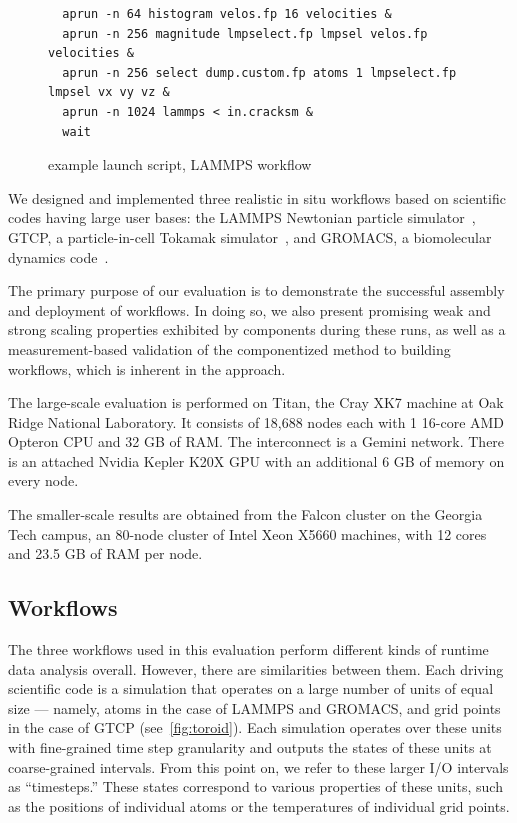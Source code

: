 \begin{figure}
  \begin{lstlisting}
  aprun -n 64 histogram velos.fp 16 velocities &
  aprun -n 256 magnitude lmpselect.fp lmpsel velos.fp velocities &
  aprun -n 256 select dump.custom.fp atoms 1 lmpselect.fp lmpsel vx vy vz &
  aprun -n 1024 lammps < in.cracksm &
  wait
  \end{lstlisting}
  \caption{\sys example launch script, LAMMPS workflow}
  \label{fig:launch-script}
\end{figure}

We designed and implemented three realistic in situ workflows based on
scientific codes having large user bases: the LAMMPS Newtonian particle
simulator~\cite{plimpton:1997:lammps}, GTCP, a particle-in-cell Tokamak
simulator~\cite{lin:gtc}, and GROMACS,
a biomolecular dynamics code~\cite{hess2008gromacs}.

The primary purpose of our evaluation is to demonstrate the
successful assembly and deployment of \sys workflows. In doing so, 
we also present promising
weak and strong scaling properties exhibited by \sys components
during these runs, as well as a measurement-based validation of
the componentized method to building workflows, which is inherent in the \sys approach.

The large-scale evaluation is performed on Titan, the Cray XK7 machine at Oak Ridge
National Laboratory. It consists of 18,688 nodes each with 1 16-core AMD
Opteron CPU and 32 GB of RAM. The interconnect is a Gemini network. There is an
attached Nvidia Kepler K20X GPU with an additional 6 GB of memory on every
node.

The smaller-scale results are obtained from the Falcon cluster
on the Georgia Tech campus, an 80-node cluster of Intel Xeon X5660 machines,
with 12 cores and 23.5 GB of RAM per node. 

\subsection{Workflows}

The three \sys workflows used in this evaluation perform
different kinds of runtime data analysis overall.
However, there are similarities between them.
Each driving scientific code is a simulation that
operates on a large number of units of equal size --- namely, atoms
in the case of LAMMPS and GROMACS, and grid points
in the case of GTCP (see~\autoref{fig:toroid}).
Each simulation operates over these units
with fine-grained time step granularity
and outputs the states of these units at coarse-grained
intervals. From this point on, we refer to these larger
I/O intervals as ``timesteps.''
These states correspond to various properties
of these units, such as the positions of individual atoms or the
temperatures of individual grid points.

